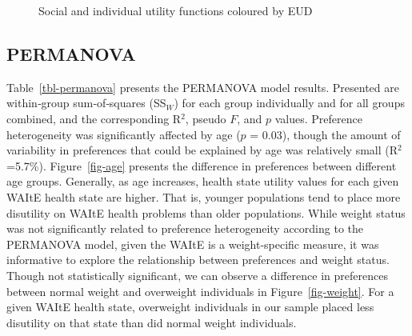\documentclass[
  number,
  preprint]{elsarticle}
\begin{document}
\begin{figure}


\caption{\label{fig-eud}Social and individual utility functions coloured
by EUD}

\end{figure}%

\subsection{PERMANOVA}\label{permanova}

Table~\ref{tbl-permanova} presents the PERMANOVA model results.
Presented are within‐group sum‐of‐squares (SS\(_W\)) for each group
individually and for all groups combined, and the corresponding R\(^2\),
pseudo \(F\), and \(p\) values. Preference heterogeneity was
significantly affected by age (\(p\) = 0.03), though the amount of
variability in preferences that could be explained by age was relatively
small (R\(^2\)=5.7\%). Figure~\ref{fig-age} presents the difference in
preferences between different age groups. Generally, as age increases,
health state utility values for each given WAItE health state are
higher. That is, younger populations tend to place more disutility on
WAItE health problems than older populations. While weight status was
not significantly related to preference heterogeneity according to the
PERMANOVA model, given the WAItE is a weight-specific measure, it was
informative to explore the relationship between preferences and weight
status. Though not statistically significant, we can observe a
difference in preferences between normal weight and overweight
individuals in Figure~\ref{fig-weight}. For a given WAItE health state,
overweight individuals in our sample placed less disutility on that
state than did normal weight individuals.
\end{document}
